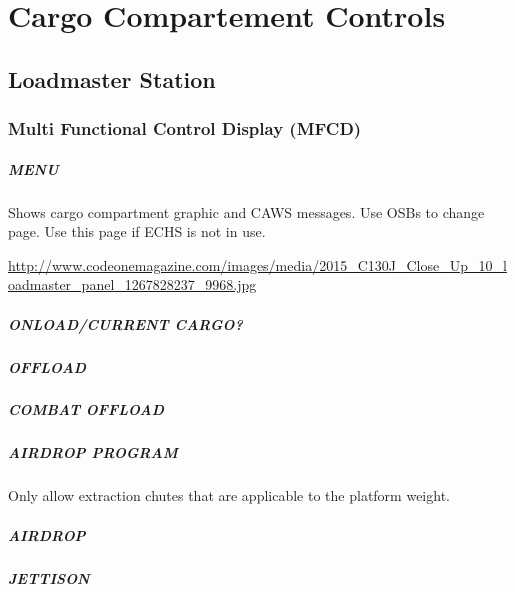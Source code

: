 \chapter{Cargo Compartement Controls}

\section{Loadmaster Station}

\subsection{Multi Functional Control Display (MFCD)}
\label{sec:mfcd}

\paragraph*{MENU}

Shows cargo compartment graphic and CAWS messages. Use \glspl{OSB} to change page. Use this page if \gls{ECHS} is not in use.

\url{http://www.codeonemagazine.com/images/media/2015_C130J_Close_Up_10_loadmaster_panel_1267828237_9968.jpg}

\paragraph*{ONLOAD/CURRENT CARGO?}

\paragraph*{OFFLOAD}

\paragraph*{COMBAT OFFLOAD}

\paragraph*{AIRDROP PROGRAM}

Only allow extraction chutes that are applicable to the platform weight.

\paragraph*{AIRDROP}

\paragraph*{JETTISON}


